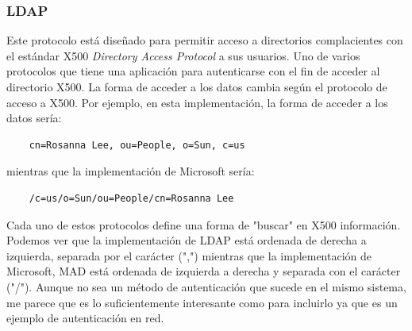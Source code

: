 \documentclass[titlepage]{article}
\begin{document}
\subsubsection{\Gls{LDAP}}
Este protocolo está diseñado para permitir acceso a directorios complacientes con el estándar \Gls{X500} \textit{Directory Access Protocol} a sus usuarios. Uno de varios protocolos que tiene una aplicación para autenticarse con el fin de acceder al directorio \Gls{X500}\cite{LDAP}. La forma de acceder a los datos cambia según el protocolo de acceso a \Gls{X500}. Por ejemplo, en esta implementación, la forma de acceder a los datos sería:
\begin{verbatim}
	cn=Rosanna Lee, ou=People, o=Sun, c=us
\end{verbatim}
mientras que la implementación de Microsoft sería:
\begin{verbatim}
	/c=us/o=Sun/ou=People/cn=Rosanna Lee
\end{verbatim}
Cada uno de estos protocolos define una forma de "buscar" en \Gls{X500} información. Podemos ver que la implementación de \Gls{LDAP} está ordenada de derecha a izquierda, separada por el carácter (",") mientras que la implementación de Microsoft, \Gls{MAD} está ordenada de izquierda a derecha y separada con el carácter ("/").
Aunque no sea un método de autenticación que sucede en el mismo sistema, me parece que es lo suficientemente interesante como para incluirlo ya que es un ejemplo de autenticación en red.
\end{document}
